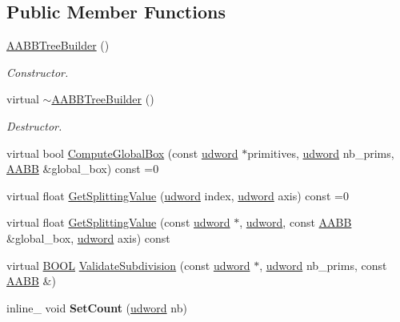 \subsection*{Public Member Functions}
\begin{DoxyCompactItemize}
\item 
\hyperlink{classOpcode_1_1AABBTreeBuilder_a9d3054a04e81cb893c0ad9c32f3e8c7f}{A\+A\+B\+B\+Tree\+Builder} ()\hypertarget{classOpcode_1_1AABBTreeBuilder_a9d3054a04e81cb893c0ad9c32f3e8c7f}{}\label{classOpcode_1_1AABBTreeBuilder_a9d3054a04e81cb893c0ad9c32f3e8c7f}

\begin{DoxyCompactList}\small\item\em Constructor. \end{DoxyCompactList}\item 
virtual \hyperlink{classOpcode_1_1AABBTreeBuilder_aee5cf728293d89920811e11154a702f9}{$\sim$\+A\+A\+B\+B\+Tree\+Builder} ()\hypertarget{classOpcode_1_1AABBTreeBuilder_aee5cf728293d89920811e11154a702f9}{}\label{classOpcode_1_1AABBTreeBuilder_aee5cf728293d89920811e11154a702f9}

\begin{DoxyCompactList}\small\item\em Destructor. \end{DoxyCompactList}\item 
virtual bool \hyperlink{classOpcode_1_1AABBTreeBuilder_a7d9fe535e2dd4649b58b416e9ef63ae8}{Compute\+Global\+Box} (const \hyperlink{IceTypes_8h_a44c6f1920ba5551225fb534f9d1a1733}{udword} $\ast$primitives, \hyperlink{IceTypes_8h_a44c6f1920ba5551225fb534f9d1a1733}{udword} nb\+\_\+prims, \hyperlink{classOpcode_1_1AABB}{A\+A\+BB} \&global\+\_\+box) const =0
\item 
virtual float \hyperlink{classOpcode_1_1AABBTreeBuilder_ab98a8fb0617c8ec21eadc51c9ff593d4}{Get\+Splitting\+Value} (\hyperlink{IceTypes_8h_a44c6f1920ba5551225fb534f9d1a1733}{udword} index, \hyperlink{IceTypes_8h_a44c6f1920ba5551225fb534f9d1a1733}{udword} axis) const =0
\item 
virtual float \hyperlink{classOpcode_1_1AABBTreeBuilder_ae33ffcdc18e729e64afc903e76769339}{Get\+Splitting\+Value} (const \hyperlink{IceTypes_8h_a44c6f1920ba5551225fb534f9d1a1733}{udword} $\ast$, \hyperlink{IceTypes_8h_a44c6f1920ba5551225fb534f9d1a1733}{udword}, const \hyperlink{classOpcode_1_1AABB}{A\+A\+BB} \&global\+\_\+box, \hyperlink{IceTypes_8h_a44c6f1920ba5551225fb534f9d1a1733}{udword} axis) const 
\item 
virtual \hyperlink{IceTypes_8h_a050c65e107f0c828f856a231f4b4e788}{B\+O\+OL} \hyperlink{classOpcode_1_1AABBTreeBuilder_a110b2b3ec294dd4a10bd463bc6547f89}{Validate\+Subdivision} (const \hyperlink{IceTypes_8h_a44c6f1920ba5551225fb534f9d1a1733}{udword} $\ast$, \hyperlink{IceTypes_8h_a44c6f1920ba5551225fb534f9d1a1733}{udword} nb\+\_\+prims, const \hyperlink{classOpcode_1_1AABB}{A\+A\+BB} \&)
\item 
inline\+\_\+ void {\bfseries Set\+Count} (\hyperlink{IceTypes_8h_a44c6f1920ba5551225fb534f9d1a1733}{udword} nb)\hypertarget{classOpcode_1_1AABBTreeBuilder_a58c22009ba142dfb4de6cbd9a6622e29}{}\label{classOpcode_1_1AABBTreeBuilder_a58c22009ba142dfb4de6cbd9a6622e29}


\end{DoxyCompactItemize}

